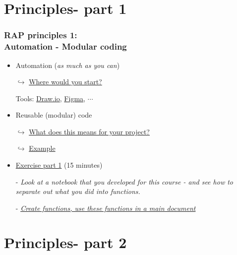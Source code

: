 \documentclass[xcolor=x11names,compress]{beamer}
\renewcommand{\(}{\begin{columns}}
\renewcommand{\)}{\end{columns}}
\newcommand{\<}[1]{\begin{column}{#1}}
\renewcommand{\>}{\end{column}}
\begin{document}
\section{Principles- part 1}

\begin{frame}[<+->]
   \frametitle{RAP principles 1:\\  Automation - Modular coding}
   \pause
    \begin{itemize}[<+->]
     \item Automation (\emph{as much as you can})
     \item[$\hookrightarrow$]\href{https://sergegoussev.github.io/ESCAP_RAP_class/docs/applying_rap/process-mapping.html\#overview-of-the-ads-processing-view}{Where would you start? }
     \item[Tools:]\href{https://app.diagrams.net/}{Draw.io}, \href{https://www.figma.com/design/}{Figma}, $\cdots$
     \item Reusable (modular) code
     \item[$\hookrightarrow$]\href{https://sergegoussev.github.io/ESCAP_RAP_class/docs/teaching_materials/sept_18/sept_18_session.html\#principle-2-modular-re-usableBuild blocs}{What does this means for your project?}
     \item[$\hookrightarrow$]\href{https://sergegoussev.github.io/ESCAP_RAP_class/docs/teaching_materials/sept_18/sept_18_session.html\#what-does-this-mean-if-we-put-it-together}{Example}
     \item \href{https://sergegoussev.github.io/ESCAP_RAP_class/docs/teaching_materials/sept_18/sept_18_session.html\#excercize-1}{Exercise part 1} (15 minutes)
     \item[-] \emph{Look at a notebook that you developed for this course - and see how to separate out what you did into functions.} 
     \item[-] \href{https://nhsdigital.github.io/rap-community-of-practice/training_resources/python/python-functions/\#coding-challenge}{\emph{Create functions, use these functions in a main document}}
    \end{itemize}
\end{frame}


\section{Principles- part 2}
\end{document}
